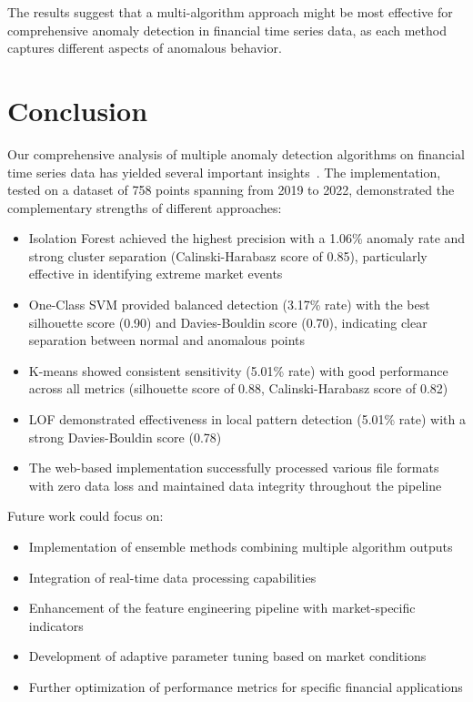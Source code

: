 \documentclass[conference]{IEEEtran}
\begin{document}
The results suggest that a multi-algorithm approach might be most effective for comprehensive anomaly detection in financial time series data, as each method captures different aspects of anomalous behavior.

\section{Conclusion}
Our comprehensive analysis of multiple anomaly detection algorithms on financial time series data has yielded several important insights~\cite{wang2024, li2024, parimi2024}. The implementation, tested on a dataset of 758 points spanning from 2019 to 2022, demonstrated the complementary strengths of different approaches:

\begin{itemize}
    \item Isolation Forest achieved the highest precision with a 1.06\% anomaly rate and strong cluster separation (Calinski-Harabasz score of 0.85), particularly effective in identifying extreme market events
    \item One-Class SVM provided balanced detection (3.17\% rate) with the best silhouette score (0.90) and Davies-Bouldin score (0.70), indicating clear separation between normal and anomalous points
    \item K-means showed consistent sensitivity (5.01\% rate) with good performance across all metrics (silhouette score of 0.88, Calinski-Harabasz score of 0.82)
    \item LOF demonstrated effectiveness in local pattern detection (5.01\% rate) with a strong Davies-Bouldin score (0.78)
    \item The web-based implementation successfully processed various file formats with zero data loss and maintained data integrity throughout the pipeline
\end{itemize}

Future work could focus on:
\begin{itemize}
    \item Implementation of ensemble methods combining multiple algorithm outputs
    \item Integration of real-time data processing capabilities
    \item Enhancement of the feature engineering pipeline with market-specific indicators
    \item Development of adaptive parameter tuning based on market conditions
    \item Further optimization of performance metrics for specific financial applications
\end{itemize}
\end{document}
